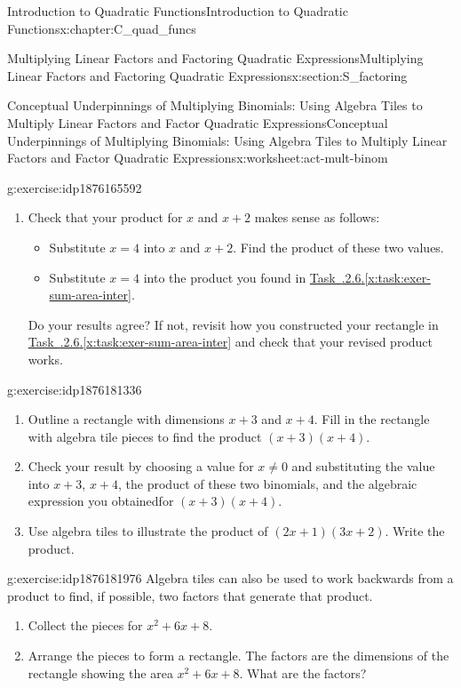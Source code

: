 \documentclass[oneside,10pt,]{book}
\newcommand{\xreffont}{\relax}
\numberwithin{equation}{chapter}
\begin{document}
\begin{chapterptx}{Introduction to Quadratic Functions}{}{Introduction to Quadratic Functions}{}{}{x:chapter:C_quad_funcs}
\begin{sectionptx}{Multiplying Linear Factors and Factoring Quadratic Expressions}{}{Multiplying Linear Factors and Factoring Quadratic Expressions}{}{}{x:section:S_factoring}
\begin{worksheet-subsection}{Conceptual Underpinnings of Multiplying Binomials: Using Algebra Tiles to Multiply Linear Factors and Factor Quadratic Expressions}{}{Conceptual Underpinnings of Multiplying Binomials: Using Algebra Tiles to Multiply Linear Factors and Factor Quadratic Expressions}{}{}{x:worksheet:act-mult-binom}
\begin{divisionexercise}{6}{}{}{g:exercise:idp1876165592}
\begin{enumerate}[font=\bfseries,label=(\alph*),ref=\alph*]
\item{}Check that your product for \(x\) and \(x + 2\) makes sense as follows:%
\begin{itemize}[label=\textbullet]
\item{}Substitute \(x = 4\) into \(x\) and \(x + 2\). Find the product of these two values.%
\item{}Substitute \(x = 4\) into the product you found in \hyperref[x:task:exer-sum-area-inter]{Task~{\xreffont 4.3.2.6}.{\xreffont\ref{x:task:exer-sum-area-inter}}}.%
\end{itemize}
Do your results agree? If not, revisit how you constructed your rectangle in \hyperref[x:task:exer-sum-area-inter]{Task~{\xreffont 4.3.2.6}.{\xreffont\ref{x:task:exer-sum-area-inter}}} and check that your revised product works.%
\end{enumerate}
\end{divisionexercise}%
\begin{divisionexercise}{7}{}{}{g:exercise:idp1876181336}%
\begin{enumerate}[font=\bfseries,label=(\alph*),ref=\alph*]
\item{}Outline a rectangle with dimensions \(x + 3\) and \(x + 4\). Fill in the rectangle with algebra tile pieces to find the product \((x + 3)(x + 4)\).%
\item{}Check your result by choosing a value for \(x \ne 0\) and substituting the value into \(x + 3\), \(x + 4\), the product of these two binomials, and the algebraic expression you obtainedfor \((x + 3)(x + 4)\).%
\item{}Use algebra tiles to illustrate the product of \((2x + 1)(3x + 2)\). Write the product.%
\end{enumerate}
\end{divisionexercise}%
\begin{divisionexercise}{8}{}{}{g:exercise:idp1876181976}%
Algebra tiles can also be used to work backwards from a product to find, if possible, two factors that generate that product.%
\begin{enumerate}[font=\bfseries,label=(\alph*),ref=\alph*]
\item{}Collect the pieces for \(x^2 + 6x + 8\).%
\item\label{x:task:exer-arrange-quad}Arrange the pieces to form a rectangle. The factors are the dimensions of the rectangle showing the area \(x^2 + 6x + 8\). What are the factors?%

\end{enumerate}
\end{divisionexercise}
\end{worksheet-subsection}
\end{sectionptx}
\end{chapterptx}
\end{document}
